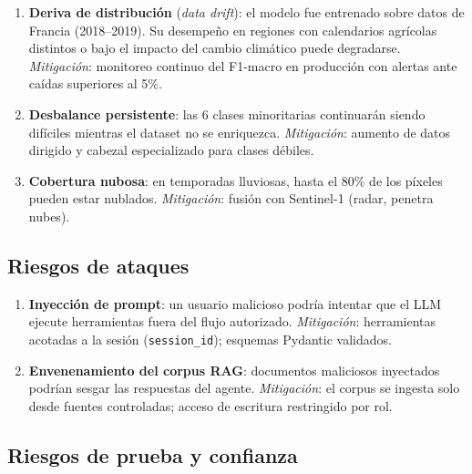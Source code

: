 \documentclass{article}
\begin{document}
\begin{enumerate}[leftmargin=*]
    \item \textbf{Deriva de distribución} (\textit{data drift}): el modelo
    fue entrenado sobre datos de Francia (2018--2019). Su desempeño en
    regiones con calendarios agrícolas distintos o bajo el impacto del
    cambio climático puede degradarse. \textit{Mitigación}: monitoreo
    continuo del F1-macro en producción con alertas ante caídas superiores
    al 5\%.

    \item \textbf{Desbalance persistente}: las 6 clases minoritarias
    continuarán siendo difíciles mientras el dataset no se enriquezca.
    \textit{Mitigación}: aumento de datos dirigido y cabezal especializado
    para clases débiles.

    \item \textbf{Cobertura nubosa}: en temporadas lluviosas, hasta el 80\%
    de los píxeles pueden estar nublados. \textit{Mitigación}: fusión con
    Sentinel-1 (radar, penetra nubes).
\end{enumerate}

\subsection{Riesgos de ataques}

\begin{enumerate}[leftmargin=*]
    \item \textbf{Inyección de prompt}: un usuario malicioso podría intentar
    que el LLM ejecute herramientas fuera del flujo autorizado.
    \textit{Mitigación}: herramientas acotadas a la sesión
    (\texttt{session\_id}); esquemas Pydantic validados.

    \item \textbf{Envenenamiento del corpus RAG}: documentos maliciosos
    inyectados podrían sesgar las respuestas del agente.
    \textit{Mitigación}: el corpus se ingesta solo desde fuentes controladas;
    acceso de escritura restringido por rol.
\end{enumerate}

\subsection{Riesgos de prueba y confianza}
\end{document}
